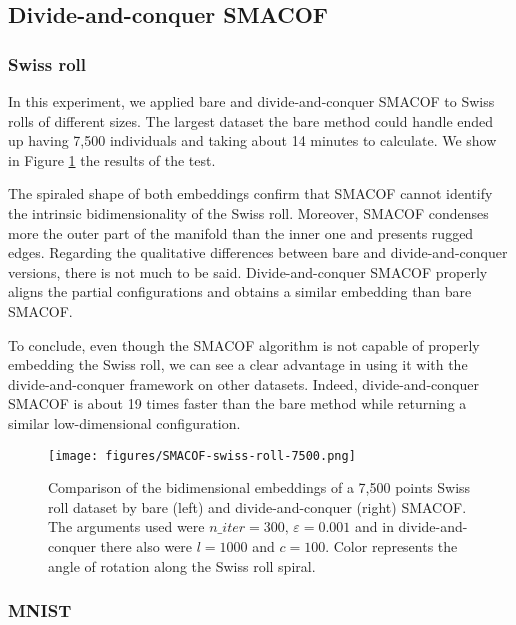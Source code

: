 \subsection{Divide-and-conquer SMACOF}
\label{sec:dc-SMACOF}

\subsubsection{Swiss roll}
\label{sec:dc-SMACOF-swiss-roll}

In this experiment, we applied bare and divide-and-conquer SMACOF to Swiss rolls of different sizes. The largest dataset the bare method could handle ended up having 7,500 individuals and taking about 14 minutes to calculate. We show in Figure \ref{fig:SMACOF-swiss-roll-7500} the results of the test.

The spiraled shape of both embeddings confirm that SMACOF cannot identify the intrinsic bidimensionality of the Swiss roll. Moreover, SMACOF condenses more the outer part of the manifold than the inner one and presents rugged edges. Regarding the qualitative differences between bare and divide-and-conquer versions, there is not much to be said. Divide-and-conquer SMACOF properly aligns the partial configurations and obtains a similar embedding than bare SMACOF.

To conclude, even though the SMACOF algorithm is not capable of properly embedding the Swiss roll, we can see a clear advantage in using it with the divide-and-conquer framework on other datasets. Indeed, divide-and-conquer SMACOF is about 19 times faster than the bare method while returning a similar low-dimensional configuration.

\begin{figure}
    \centering
    \texttt{[image: figures/SMACOF-swiss-roll-7500.png]}
    \caption{Comparison of the bidimensional embeddings of a 7,500 points Swiss roll dataset by bare (left) and divide-and-conquer (right) SMACOF. The arguments used were $n\_iter = 300,\, \varepsilon = 0.001$ and in divide-and-conquer there also were $l=1000$ and $c=100$. Color represents the angle of rotation along the Swiss roll spiral.}
    \label{fig:SMACOF-swiss-roll-7500}
\end{figure}


\subsubsection{MNIST}
\label{sec:dc-SMACOF-MNIST}


